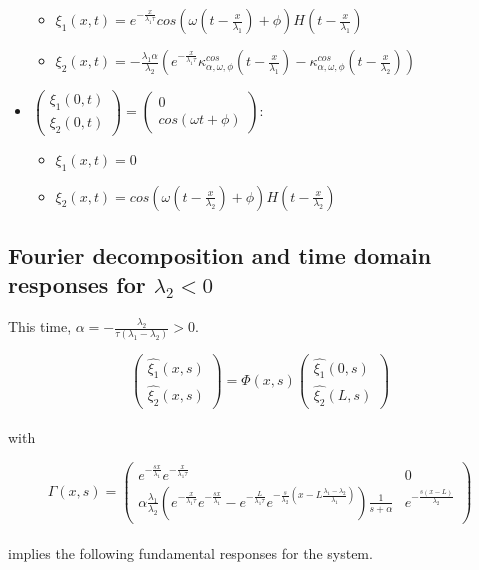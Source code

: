 \documentclass[preprint]{elsarticle}
\begin{document}
\begin{itemize}
\begin{itemize}
\item $\xi_{1}\left(x,t\right)=e^{-\frac{x}{\lambda_{1}\tau}}cos\left(\omega\left(t-\frac{x}{\lambda_{1}}\right)+\phi\right)H\left(t-\frac{x}{\lambda_{1}}\right)$
\item $\xi_{2}\left(x,t\right)=-\frac{\lambda_{1}\alpha}{\lambda_{2}}\left(e^{-\frac{x}{\lambda_{1}\tau}}\kappa_{\alpha,\omega,\phi}^{cos}\left(t-\frac{x}{\lambda_{1}}\right)-\kappa_{\alpha,\omega,\phi}^{cos}\left(t-\frac{x}{\lambda_{2}}\right)\right)$
\end{itemize}
\item $\left(\begin{array}{c}
\xi_{1}\left(0,t\right)\\
\xi_{2}\left(0,t\right)
\end{array}\right)=\left(\begin{array}{c}
0\\
cos\left(\omega t+\phi\right)
\end{array}\right)$:

\begin{itemize}
\item $\xi_{1}\left(x,t\right)=0$
\item $\xi_{2}\left(x,t\right)=cos\left(\omega\left(t-\frac{x}{\lambda_{2}}\right)+\phi\right)H\left(t-\frac{x}{\lambda_{2}}\right)$
\end{itemize}
\end{itemize}

\subsection{Fourier decomposition and time domain responses for $\lambda_{2}<0$}

This time, $\alpha=-\frac{\lambda_{2}}{\tau\left(\lambda_{1}-\lambda_{2}\right)}>0$.

\[
\left(\begin{array}{c}
\widehat{\xi_{1}}\left(x,s\right)\\
\widehat{\xi_{2}}\left(x,s\right)
\end{array}\right)=\Phi\left(x,s\right)\left(\begin{array}{c}
\widehat{\xi_{1}}\left(0,s\right)\\
\widehat{\xi_{2}}\left(L,s\right)
\end{array}\right)
\]
\\
with

\[
\varGamma\left(x,s\right)=\left(\begin{array}{cc}
e^{-\frac{sx}{\lambda_{1}}}e^{-\frac{x}{\lambda_{1}\tau}} & 0\\
\alpha\frac{\lambda_{1}}{\lambda_{2}}\left(e^{-\frac{x}{\lambda_{1}\tau}}e^{-\frac{sx}{\lambda_{1}}}-e^{-\frac{L}{\lambda_{1}\tau}}e^{-\frac{s}{\lambda_{2}}\left(x-L\frac{\lambda_{1}-\lambda_{2}}{\lambda_{1}}\right)}\right)\frac{1}{s+\alpha} & e^{-\frac{s\left(x-L\right)}{\lambda_{2}}}
\end{array}\right)
\]
\\
implies the following fundamental responses for the system.
\end{document}
